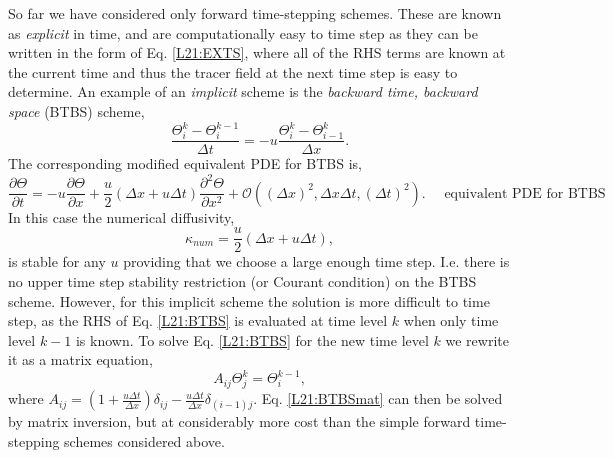 So far we have considered only forward time-stepping schemes. These
are known as \textit{explicit} in time, and are computationally easy
to time step as they can be written in the form of
Eq. \eqref{L21:EXTS}, where all of the RHS terms are known at the
current time and thus the tracer field at the next time step is easy
to determine. An example of an \textit{implicit} scheme is the
\textit{backward time, backward space} (BTBS) scheme,
\begin{equation}
  \frac{\Theta_i^{k}-\Theta_i^{k-1}}{\Delta t} = -u
  \frac{\Theta_i^{k}-\Theta^k_{i-1}}{\Delta x}.\label{L21:BTBS}
\end{equation}
The corresponding modified equivalent PDE for BTBS is,
\begin{equation}
  \frac{\partial\Theta}{\partial t} = -u
  \frac{\partial\Theta}{\partial x} + \frac{u}{2}\left(\Delta x + u
    \Delta t\right)\frac{\partial^2\Theta}{\partial x^2} +
    \mathcal{O}\left((\Delta x)^2,\Delta x\Delta t,(\Delta
      t)^2\right).\quad\text{ equivalent PDE for BTBS}\label{L21:FTCSepde}
\end{equation}
In this case the numerical diffusivity,
\begin{equation}
  \kappa_{num} = \frac{u}{2}\left(\Delta x + u\Delta t\right),
\end{equation}
is stable for any $u$ providing that we choose a large enough time
step. I.e. there is no upper time step stability restriction (or
Courant condition) on the BTBS scheme. However, for this implicit
scheme the solution is more difficult to time step, as the RHS of
Eq. \eqref{L21:BTBS} is evaluated at time level $k$ when only time
level $k-1$ is known. To solve Eq. \eqref{L21:BTBS} for the new time
level $k$ we rewrite it as a matrix equation,
\begin{equation}
  A_{ij}\Theta_j^k = \Theta_i^{k-1},\label{L21:BTBSmat}
\end{equation}
where
$A_{ij} = (1+\frac{u\Delta t}{\Delta x})\delta_{ij} - \frac{u\Delta
  t}{\Delta x}\delta_{(i-1)j}$. Eq. \eqref{L21:BTBSmat} can then be
solved by matrix inversion, but at considerably more cost than the
simple forward time-stepping schemes considered above.

